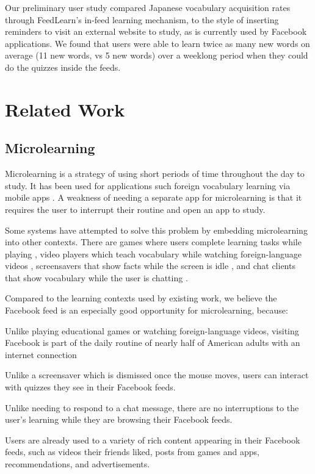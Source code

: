 \documentclass{chi-ext}
\begin{document}
Our preliminary user study compared Japanese vocabulary acquisition rates through FeedLearn's in-feed learning mechanism, to the style of inserting reminders to visit an external website to study, as is currently used by Facebook applications. We found that users were able to learn twice as many new words on average (11 new words, vs 5 new words) over a weeklong period when they could do the quizzes inside the feeds.

\section{Related Work}

\subsection{Microlearning}

Microlearning is a strategy of using short periods of time throughout the day to study. It has been used for applications such foreign vocabulary learning via mobile apps \cite{microlearning} \cite{micromandarin}. A weakness of needing a separate app for microlearning is that it requires the user to interrupt their routine and open an app to study. %

Some systems have attempted to solve this problem by embedding microlearning into other contexts. There are games where users complete learning tasks while playing \cite{carriearcade}, video players which teach vocabulary while watching foreign-language videos \cite{smartsubtitles}, screensavers that show facts while the screen is idle \cite{screensaver}, and chat clients that show vocabulary while the user is chatting \cite{waitlearning}.

Compared to the learning contexts used by existing work, we believe the Facebook feed is an especially good opportunity for microlearning, because:

\begin{compactitem}
\item Unlike playing educational games or watching foreign-language videos, visiting Facebook is part of the daily routine of nearly half of American adults with an internet connection \cite{socialmediaupdate} %
\item Unlike a screensaver which is dismissed once the mouse moves, users can interact with quizzes they see in their Facebook feeds.
\item Unlike needing to respond to a chat message, there are no interruptions to the user's learning while they are browsing their Facebook feeds.
\item Users are already used to a variety of rich content appearing in their Facebook feeds, such as videos their friends liked, posts from games and apps, recommendations, and advertisements.
\end{compactitem}
\end{document}
